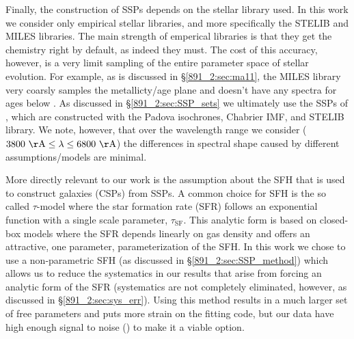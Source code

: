 Finally, the construction of SSPs depends on the stellar library
used. In this work we consider only empirical stellar libraries, and
more specifically the STELIB \citep{LeBorgne03} and MILES
\citep{Sanchez-Blazquez06} libraries. The main strength of emperical
libraries is that they get the chemistry right by default, as indeed
they must. The cost of this accuracy, however, is a very limit
sampling of the entire parameter space of stellar evolution. For
example, as is discussed in \S\ref{891_2:sec:ma11}, the MILES library
very coarsly samples the metallicty/age plane and doesn't have any
spectra for ages below . 
As discussed in \S\ref{891_2:sec:SSP_sets} we ultimately use the SSPs
of \citet{Bruzual03}, which are constructed with the Padova
isochrones, Chabrier IMF, and STELIB library. We note, however, that
over the wavelength range we consider ($\val{3800}{\AA}
\leq\lambda\leq \val{6800}{\AA}$) the differences in spectral shape
caused by different assumptions/models are minimal.

More directly relevant to our work is the assumption about the SFH
that is used to construct galaxies (CSPs) from SSPs. A common choice
for SFH is the so called $\tau$-model where the star formation rate
(SFR) follows an exponential function with a single scale parameter,
$\tau_\mathrm{SF}$. This analytic form is based on closed-box models
where the SFR depends linearly on gas density \citep{Schmidt59} and
offers an attractive, one parameter, parameterization of the SFH. In
this work we chose to use a non-parametric SFH (as discussed in
\S\ref{891_2:sec:SSP_method}) which allows us to reduce the
systematics in our results that arise from forcing an analytic form of
the SFR (systematics are not completely eliminated, however, as
discussed in \S\ref{891_2:sec:sys_err}). Using this method results in
a much larger set of free parameters and puts more strain on the
fitting code, but our data have high enough signal to noise
() to make it a viable option.

